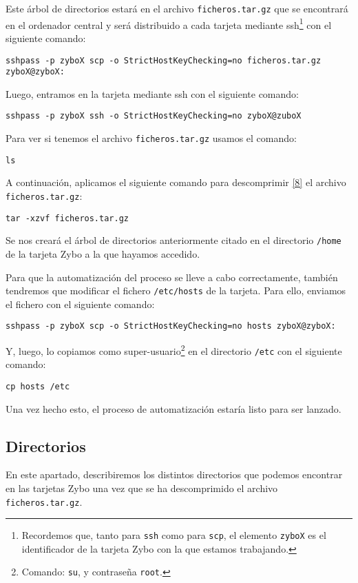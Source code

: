 Este árbol de directorios estará en el archivo \texttt{ficheros.tar.gz} que se encontrará en el ordenador central y será distribuido a cada tarjeta mediante ssh\footnote{Recordemos que, tanto para \texttt{ssh} como para \texttt{scp}, el elemento \texttt{zyboX} es el identificador de la tarjeta Zybo con la que estamos trabajando.} con el siguiente comando:
\begin{center}
	\texttt{sshpass -p zyboX scp -o StrictHostKeyChecking=no ficheros.tar.gz zyboX@zyboX:}
\end{center}

Luego, entramos en la tarjeta mediante ssh con el siguiente comando:
\begin{center}
	\texttt{sshpass -p zyboX ssh -o StrictHostKeyChecking=no zyboX@zuboX}
\end{center}

Para ver si tenemos el archivo \texttt{ficheros.tar.gz} usamos el comando:
\begin{center}
	\texttt{ls}
\end{center}

A continuación, aplicamos el siguiente comando para descomprimir \hyperlink{8}{[8]} el archivo \texttt{ficheros.tar.gz}:
\begin{center}
	\texttt{tar -xzvf ficheros.tar.gz}
\end{center}

Se nos creará el árbol de directorios anteriormente citado en el directorio \texttt{/home} de la tarjeta Zybo a la que hayamos accedido.

Para que la automatización del proceso se lleve a cabo correctamente, también tendremos que modificar el fichero \texttt{/etc/hosts} de la tarjeta. Para ello, enviamos el fichero con el siguiente comando:
\begin{center}
	\texttt{sshpass -p zyboX scp -o StrictHostKeyChecking=no hosts zyboX@zyboX:}
\end{center}

Y, luego, lo copiamos como super-usuario\footnote{Comando: \texttt{su}, y contraseña \texttt{root}.} en el directorio \texttt{/etc} con el siguiente comando:
\begin{center}
	\texttt{cp hosts /etc}
\end{center}

Una vez hecho esto, el proceso de automatización estaría listo para ser lanzado.

\subsection{Directorios}
En este apartado, describiremos los distintos directorios que podemos encontrar en las tarjetas Zybo una vez que se ha descomprimido el archivo \texttt{ficheros.tar.gz}.

